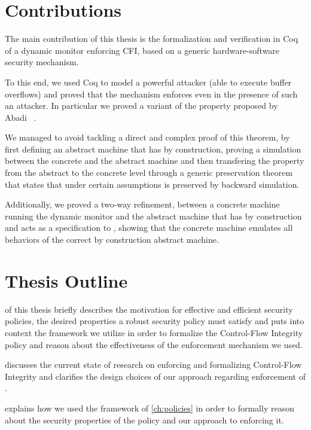 \section{Contributions}\label{sec:contributions}

The main contribution of this thesis is the formalization and
verification in Coq of a dynamic monitor enforcing CFI, based on a
generic hardware-software security mechanism.

To this end, we used Coq to model a powerful attacker (\IE able to
execute buffer overflows) and proved that the mechanism enforces
\CFI even in the presence of such an attacker. In particular
we proved a variant of the \CFI property proposed by Abadi~\ETAL
\cite{AbadiBEL09}.

We managed to avoid tackling a direct and complex proof of this
theorem, by first defining an abstract machine that has \CFI by
construction, proving a simulation between the concrete and the
abstract machine and then transfering the \CFI property from the
abstract to the concrete level through a generic preservation theorem
that states that under certain assumptions \CFI is preserved by
backward simulation.

Additionally, we proved a two-way refinement, between a concrete
machine running the \CFI dynamic monitor and the abstract machine that
has \CFI by construction and acts as a specification to \CFI, showing
that the concrete machine emulates all behaviors of the
correct by construction abstract machine.


\section{Thesis Outline}\label{sec:outline}
 of this thesis briefly describes the motivation for
effective and efficient security policies, the desired properties a
robust security policy must satisfy and puts into context the
framework we utilize in order to formalize the Control-Flow Integrity policy
and reason about the effectiveness of the enforcement mechanism we used.

 discusses the current state of
research on enforcing and formalizing Control-Flow Integrity and clarifies
the design choices of our approach regarding enforcement of \CFI.

 explains how we used the framework of \cref{ch:policies}
in order to formally reason about the security properties of the \CFI policy and
our approach to enforcing it.

